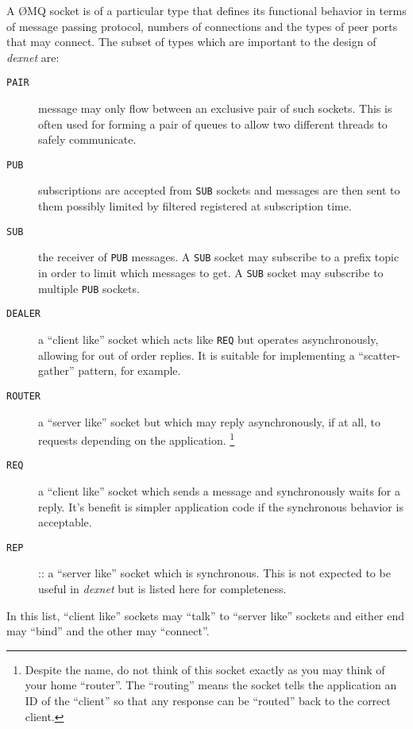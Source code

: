 \documentclass[letterpaper,oneside]{memoir}
\def\pair{\texttt{PAIR}\xspace}
\def\pub{\texttt{PUB}\xspace}
\def\sub{\texttt{SUB}\xspace}
\def\rep{\texttt{REP}\xspace}
\def\req{\texttt{REQ}\xspace}
\def\router{\texttt{ROUTER}\xspace}
\def\dealer{\texttt{DEALER}\xspace}
\def\zmq{\O{}MQ\xspace}
\def\dexnet{\textit{dexnet}\xspace}
\begin{document}
A \zmq socket is of a particular type that defines its functional behavior in terms of message passing protocol, numbers of connections and the types of peer ports that may connect. 
The subset of types which are important to the design of \dexnet are:

\begin{description}

\item[\pair] message may only flow between an exclusive pair of such sockets. 
  This is often used for forming a pair of queues to allow two different threads to safely communicate.

\item[\pub] subscriptions are accepted from \sub sockets and messages are then sent to them possibly limited by filtered registered at subscription time.

\item[\sub] the receiver of \pub messages. 
  A \sub socket may subscribe to a prefix topic in order to limit which messages to get. 
  A \sub socket may subscribe to multiple \pub sockets.

\item[\dealer] a ``client like'' socket which acts like \req but operates asynchronously, allowing for out of order replies.  It is suitable for implementing a ``scatter-gather'' pattern, for example.

\item[\router] a ``server like'' socket but which may reply asynchronously, if at all, to requests depending on the application. \footnote{Despite the name, do not think of this socket exactly as you may think of your home ``router''.  The ``routing'' means the socket tells the application an ID of the ``client'' so that any response can be ``routed'' back to the correct client.}  

\item[\req] a ``client like'' socket which sends a message and synchronously waits for a reply. 
  It's benefit is simpler application code if the synchronous behavior is acceptable.

\item[\rep]:: a ``server like'' socket which is synchronous. 
  This is not expected to be useful in \dexnet but is listed here for completeness.

\end{description}

\noindent In this list, ``client like'' sockets may ``talk'' to ``server like'' sockets and either end may ``bind'' and the other may ``connect''.
\end{document}

